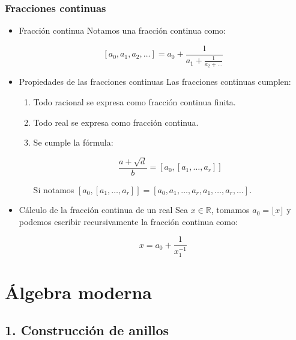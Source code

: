 \documentclass[11pt]{article}
\begin{document}
\subsubsection*{Fracciones continuas}
\label{sec-6-1-4}
\begin{itemize}
\item Fracción continua
\label{sec-6-1-4-1}
Notamos una fracción continua como:

\[
[a_0,a_1,a_2,\dots] =
a_0 + \frac{1}{a_1+\frac{1}{a_2+\dots}}
\]

\item Propiedades de las fracciones continuas
\label{sec-6-1-4-2}
Las fracciones continuas cumplen:

\begin{enumerate}
\item Todo racional se expresa como fracción continua finita.
\item Todo real se expresa como fracción continua.
\item Se cumple la fórmula:

\[\frac{a+\sqrt{d}}{b} = [a_0,[a_1,\dots,a_r]]\]

Si notamos $[a_0,[a_1,\dots,a_r]] = [a_0,a_1,\dots,a_r,a_1,\dots,a_r,\dots]$.
\end{enumerate}

\item Cálculo de la fracción continua de un real
\label{sec-6-1-4-3}
Sea $x \in \mathbb{R}$, tomamos $a_0 = \lfloor x \rfloor$ y podemos escribir recursivamente la 
fracción continua como:

\[
x = a_0 + \frac{1}{x_1^{-1}}
\]
\end{itemize}
\section*{Álgebra moderna}
\label{sec-7}
\subsection*{1. Construcción de anillos}
\label{sec-7-1}
\end{document}
